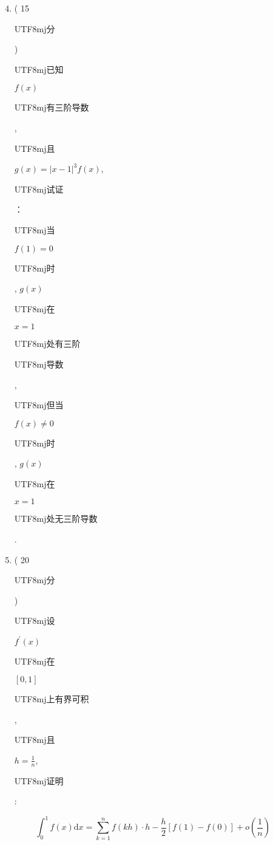 \documentclass[10pt]{article}
\begin{document}
\begin{enumerate}
  \setcounter{enumi}{3}
  \item ( 15 \begin{CJK}{UTF8}{mj}分\end{CJK}) \begin{CJK}{UTF8}{mj}已知\end{CJK} $f(x)$ \begin{CJK}{UTF8}{mj}有三阶导数\end{CJK}, \begin{CJK}{UTF8}{mj}且\end{CJK} $g(x)=|x-1|^{3} f(x)$, \begin{CJK}{UTF8}{mj}试证\end{CJK}：\begin{CJK}{UTF8}{mj}当\end{CJK} $f(1)=0$ \begin{CJK}{UTF8}{mj}时\end{CJK}, $g(x)$ \begin{CJK}{UTF8}{mj}在\end{CJK} $x=1$ \begin{CJK}{UTF8}{mj}处有三阶\end{CJK} \begin{CJK}{UTF8}{mj}导数\end{CJK}, \begin{CJK}{UTF8}{mj}但当\end{CJK} $f(x) \neq 0$ \begin{CJK}{UTF8}{mj}时\end{CJK}, $g(x)$ \begin{CJK}{UTF8}{mj}在\end{CJK} $x=1$ \begin{CJK}{UTF8}{mj}处无三阶导数\end{CJK}.

  \item ( 20 \begin{CJK}{UTF8}{mj}分\end{CJK}) \begin{CJK}{UTF8}{mj}设\end{CJK} $f^{\prime}(x)$ \begin{CJK}{UTF8}{mj}在\end{CJK} $[0,1]$ \begin{CJK}{UTF8}{mj}上有界可积\end{CJK}, \begin{CJK}{UTF8}{mj}且\end{CJK} $h=\frac{1}{n}$, \begin{CJK}{UTF8}{mj}证明\end{CJK}:

\end{enumerate}
$$
\int_{0}^{1} f(x) \mathrm{d} x=\sum_{k=1}^{n} f(k h) \cdot h-\frac{h}{2}[f(1)-f(0)]+o\left(\frac{1}{n}\right)
$$
\end{document}
